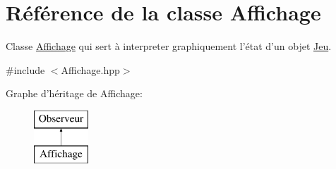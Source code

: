 \hypertarget{class_affichage}{\section{Référence de la classe Affichage}
\label{class_affichage}
}


Classe \hyperlink{class_affichage}{Affichage} qui sert à interpreter graphiquement l'état d'un objet \hyperlink{class_jeu}{Jeu}.  




{\ttfamily \#include $<$Affichage.\-hpp$>$}

Graphe d'héritage de Affichage\-:\begin{figure}[H]
\begin{center}
\leavevmode
\includegraphics[height=2.000000cm]{class_affichage}
\end{center}
\end{figure}
